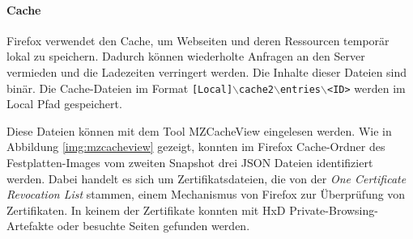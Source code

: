 \begin{appendices}
\paragraph*{Cache}
Firefox verwendet den Cache, um Webseiten und deren Ressourcen temporär lokal zu speichern. Dadurch können wiederholte Anfragen an den Server vermieden und die Ladezeiten verringert werden. Die Inhalte dieser Dateien sind binär.
Die Cache-Dateien im Format \texttt{[Local]$\backslash$cache2$\backslash$entries$\backslash$<ID>} werden im Local Pfad gespeichert.

Diese Dateien können mit dem Tool MZCacheView eingelesen werden.
Wie in Abbildung \ref{img:mzcacheview} gezeigt, konnten im Firefox Cache-Ordner des Festplatten-Images vom zweiten Snapshot drei JSON Dateien identifiziert werden. Dabei handelt es sich um Zertifikatsdateien, die von der \textit{One Certificate Revocation List} stammen, einem Mechanismus von Firefox zur Überprüfung von Zertifikaten. In keinem der Zertifikate konnten mit HxD Private-Browsing-Artefakte oder besuchte Seiten gefunden werden. \cite{TechSupportGuy.05.06.2023}
{}
\end{appendices}
